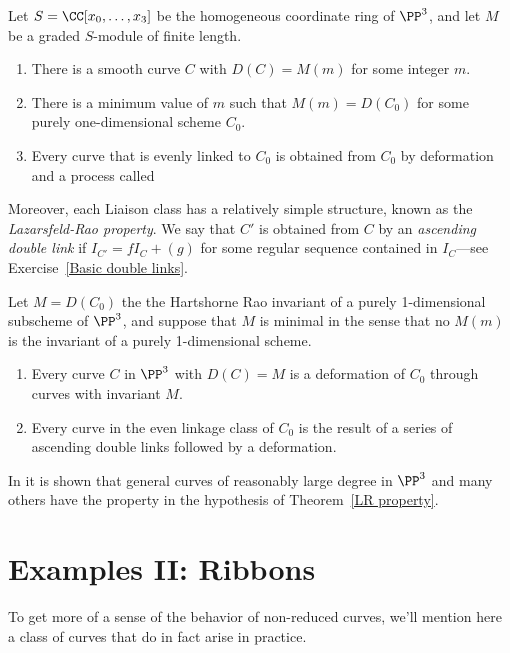 \begin{fact}
\begin{theorem}
Let $S = \CC[x_0, \dots, x_3]$ be the homogeneous coordinate ring of $\PP^3$, and let $M$ be a graded $S$-module of finite length.
\begin{enumerate}
\item There is a smooth curve $C$ with $D(C) = M(m)$ for some integer $m$.
\item There is a minimum value of $m$ such that $M(m) = D(C_0)$ for some purely one-dimensional scheme $C_0$.
\item Every curve that is evenly linked to $C_0$ is obtained from $C_0$ by deformation and a process called
\end{enumerate}
\end{theorem}

Moreover, each Liaison class has a relatively simple structure, known as the \emph{Lazarsfeld-Rao property}.
We say that $C'$ is obtained from $C$ by an \emph{ascending double link} if $I_{C'} = fI_C+(g)$ for some regular sequence
contained in $I_C$---see Exercise~\ref{Basic double links}. 

\begin{theorem}\cite{MR1087803}\label{LR property}
Let $M = D(C_0)$ the the Hartshorne Rao invariant of a purely 1-dimensional subscheme of $\PP^3$, and suppose that
$M$ is minimal in the sense that no $M(m)$ is the invariant of a purely 1-dimensional scheme. 
\begin{enumerate}
 \item Every curve $C$ in $\PP^3$ with $D(C) = M$ is a deformation of $C_0$ through curves with invariant $M$.
 \item Every curve in the even linkage class of $C_0$ is the result of a series of ascending double links followed by a deformation.
\end{enumerate}
\end{theorem}

In \cite{MR714753} it is shown that general curves of reasonably large degree in $\PP^3$ and many others have the property in the hypothesis
of  Theorem~\ref{LR property}.
\end{fact}

\section{Examples II: Ribbons}

To get more of a sense of the behavior of non-reduced curves, we'll mention here a class of curves that do in fact arise in practice.

